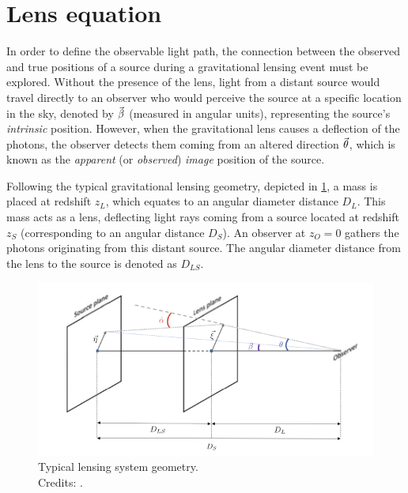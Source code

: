 \section{Lens equation}
\label{sec:lens_equation}

In order to define the observable light path, the connection between the observed and true positions of a source during a gravitational lensing event must be explored. Without the presence of the lens, light from a distant source would travel directly to an observer who would perceive the source at a specific location in the sky, denoted by $\va{\beta}$ (measured in angular units), representing the source's \emph{intrinsic} position. However, when the gravitational lens causes a deflection of the photons, the observer detects them coming from an altered direction $\va{\theta}$, which is known as the \emph{apparent} (or \emph{observed}) \emph{image} position of the source.

Following the typical gravitational lensing geometry, depicted in \cref{fig:lensing_sketch}, a mass is placed at redshift $z_L$, which equates to an angular diameter distance $D_L$. This mass acts as a lens, deflecting light rays coming from a source located at redshift $z_S$ (corresponding to an angular distance $D_S$). An observer at $z_O=0$ gathers the photons originating from this distant source. The angular diameter distance from the lens to the source is denoted as $D_{LS}$.

\begin{figure}
    \centering
    \includegraphics[width=\linewidth, keepaspectratio]{img/chapter2/lensing_sketch.png}
    \caption[Lensing system geometry]{Typical lensing system geometry.\\\small{Credits: \cite{meneghetti_introduction_2021}.}}
    \label{fig:lensing_sketch}
\end{figure}

